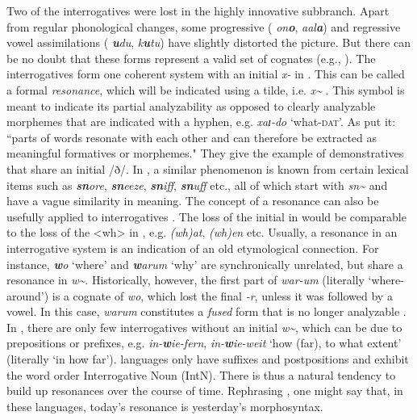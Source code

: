 \documentclass[output=paper,hidelinks]{langscibook}
\begin{document}
\noindent Two of the interrogatives were lost in the highly innovative  subbranch. Apart from regular phonological changes, some progressive ( \textit{on\textbf{o}},  \textit{aal\textbf{a}}) and regressive vowel assimilations ( \textit{\textbf{u}du},  \textit{k\textbf{u}tu}) have slightly distorted the picture. But there can be no doubt that these forms represent a valid set of cognates (e.g., \citealt[114]{Benzing1956}). The interrogatives form one coherent system with an initial \textit{x-} in . This can be called a formal \textit{resonance}, which will be indicated using a tilde, i.e. \textit{x\textasciitilde}{ }\citep{Hölzl2018b}. This symbol is meant to indicate its partial analyzability as opposed to clearly analyzable morphemes that are indicated with a hyphen, e.g.  \textit{xaɪ-do} `what-\textsc{dat}'. As \citet[209]{BickelNichols2007} put it: ``parts of words resonate with each other and can therefore be extracted as meaningful formatives or morphemes." They give the example of  demonstratives that share an initial /ð/. In , a similar phenomenon is known from certain lexical items such as \textit{\textbf{sn}ore}, \textit{\textbf{sn}eeze}, \textit{\textbf{sn}iff}, \textit{\textbf{sn}uff} etc., all of which start with \textit{sn\textasciitilde}{ }and have a vague similarity in meaning. The concept of a resonance can also be usefully applied to interrogatives \citep{Mackenzie2009}. The loss of the initial in  would be comparable to the loss of the <wh> in , e.g. \textit{(wh)at}, \textit{(wh)en} etc. Usually, a resonance in an interrogative system is an indication of an old etymological connection. For instance,  \textit{\textbf{w}o} `where' and \textit{\textbf{w}arum} `why' are synchronically unrelated, but share a resonance in \textit{w\textasciitilde}. Historically, however, the first part of \textit{war-um} (literally `where-around') is a cognate of \textit{wo}, which lost the final \textit{-r}, unless it was followed by a vowel. In this case, \textit{warum} constitutes a \textit{fused} form that is no longer analyzable \citep{MuyskenSmith1990}. In , there are only few interrogatives without an initial \textit{w\textasciitilde}, which can be due to prepositions or prefixes, e.g. \textit{in-\textbf{w}ie-fern}, \textit{in-\textbf{w}ie-weit} `how (far), to what extent' (literally `in how far').  languages only have suffixes and postpositions and exhibit the word order Interrogative Noun (IntN). There is thus a natural tendency to build up resonances over the course of time. Rephrasing \citet[413]{Givón1971}, one might say that, in these languages, today's resonance is yesterday's morphosyntax.
\end{document}
